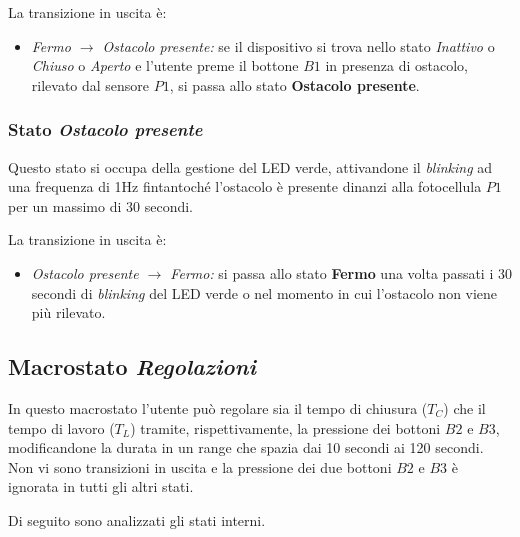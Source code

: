         \noindent La transizione in uscita è:
        \begin{itemize}
            \item \textit{Fermo $\rightarrow$ Ostacolo presente:} se il dispositivo si trova nello stato \textit{Inattivo} o \textit{Chiuso} o \textit{Aperto} e l'utente preme il bottone $B1$ in presenza di ostacolo, rilevato dal sensore $P1$, si passa allo stato \textbf{Ostacolo presente}.
        \end{itemize} 

    \subsubsection{Stato \textit{Ostacolo presente}}
        Questo stato si occupa della gestione del LED verde, attivandone il \textit{blinking} ad una frequenza di 1Hz fintantoché l'ostacolo è presente dinanzi alla fotocellula $P1$ per un massimo di 30 secondi.

        \noindent La transizione in uscita è:
        \begin{itemize}
            \item \textit{Ostacolo presente $\rightarrow$ Fermo:} si passa allo stato \textbf{Fermo} una volta passati i 30 secondi di \textit{blinking} del LED verde o nel momento in cui l'ostacolo non viene più rilevato.
        \end{itemize}


\subsection{Macrostato \textit{Regolazioni}}
    In questo macrostato l'utente può regolare sia il tempo di chiusura ($T_C$) che il tempo di lavoro ($T_L$) tramite, rispettivamente, la pressione dei bottoni $B2$ e $B3$, modificandone la durata in un range che spazia dai 10 secondi ai 120 secondi. Non vi sono transizioni in uscita e la pressione dei due bottoni $B2$ e $B3$ è ignorata in tutti gli altri stati.

    \noindent Di seguito sono analizzati gli stati interni.

